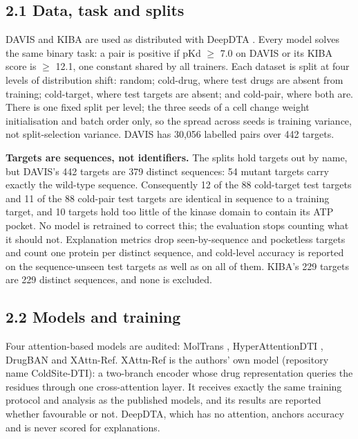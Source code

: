 \documentclass[
  11pt,
]{article}
\begin{document}
\subsection{2.1 Data, task and splits}\label{data-task-and-splits}

DAVIS \citep{Davis2011} and KIBA \citep{Tang2014} are used as distributed with DeepDTA \citep{Ozturk2018}. Every model solves the same binary task: a pair is positive if pKd $\geq$ 7.0 on DAVIS or its KIBA score is $\geq$ 12.1, one constant shared by all trainers. Each dataset is split at four levels of distribution shift: random; cold-drug, where test drugs are absent from training; cold-target, where test targets are absent; and cold-pair, where both are. There is one fixed split per level; the three seeds of a cell change weight initialisation and batch order only, so the spread across seeds is training variance, not split-selection variance. DAVIS has 30,056 labelled pairs over 442 targets.

\textbf{Targets are sequences, not identifiers.} The splits hold targets out by name, but DAVIS's 442 targets are 379 distinct sequences: 54 mutant targets carry exactly the wild-type sequence. Consequently 12 of the 88 cold-target test targets and 11 of the 88 cold-pair test targets are identical in sequence to a training target, and 10 targets hold too little of the kinase domain to contain its ATP pocket. No model is retrained to correct this; the evaluation stops counting what it should not. Explanation metrics drop seen-by-sequence and pocketless targets and count one protein per distinct sequence, and cold-level accuracy is reported on the sequence-unseen test targets as well as on all of them. KIBA's 229 targets are 229 distinct sequences, and none is excluded.

\subsection{2.2 Models and training}\label{models-and-training}

Four attention-based models are audited: MolTrans \citep{Huang2021}, HyperAttentionDTI \citep{Zhao2022}, DrugBAN \citep{Bai2023} and XAttn-Ref. XAttn-Ref is the authors' own model (repository name ColdSite-DTI): a two-branch encoder whose drug representation queries the residues through one cross-attention layer. It receives exactly the same training protocol and analysis as the published models, and its results are reported whether favourable or not. DeepDTA, which has no attention, anchors accuracy and is never scored for explanations.
\end{document}
